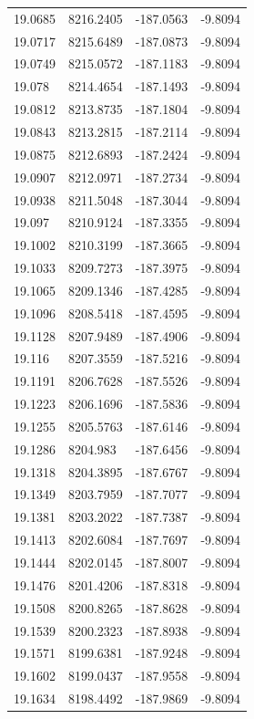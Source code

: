 \begin{table}[H]
\begin{tabular}{llll}
19.0685 & 8216.2405 & -187.0563 & -9.8094 \\
19.0717 & 8215.6489 & -187.0873 & -9.8094 \\
19.0749 & 8215.0572 & -187.1183 & -9.8094 \\
19.078 & 8214.4654 & -187.1493 & -9.8094 \\
19.0812 & 8213.8735 & -187.1804 & -9.8094 \\
19.0843 & 8213.2815 & -187.2114 & -9.8094 \\
19.0875 & 8212.6893 & -187.2424 & -9.8094 \\
19.0907 & 8212.0971 & -187.2734 & -9.8094 \\
19.0938 & 8211.5048 & -187.3044 & -9.8094 \\
19.097 & 8210.9124 & -187.3355 & -9.8094 \\
19.1002 & 8210.3199 & -187.3665 & -9.8094 \\
19.1033 & 8209.7273 & -187.3975 & -9.8094 \\
19.1065 & 8209.1346 & -187.4285 & -9.8094 \\
19.1096 & 8208.5418 & -187.4595 & -9.8094 \\
19.1128 & 8207.9489 & -187.4906 & -9.8094 \\
19.116 & 8207.3559 & -187.5216 & -9.8094 \\
19.1191 & 8206.7628 & -187.5526 & -9.8094 \\
19.1223 & 8206.1696 & -187.5836 & -9.8094 \\
19.1255 & 8205.5763 & -187.6146 & -9.8094 \\
19.1286 & 8204.983 & -187.6456 & -9.8094 \\
19.1318 & 8204.3895 & -187.6767 & -9.8094 \\
19.1349 & 8203.7959 & -187.7077 & -9.8094 \\
19.1381 & 8203.2022 & -187.7387 & -9.8094 \\
19.1413 & 8202.6084 & -187.7697 & -9.8094 \\
19.1444 & 8202.0145 & -187.8007 & -9.8094 \\
19.1476 & 8201.4206 & -187.8318 & -9.8094 \\
19.1508 & 8200.8265 & -187.8628 & -9.8094 \\
19.1539 & 8200.2323 & -187.8938 & -9.8094 \\
19.1571 & 8199.6381 & -187.9248 & -9.8094 \\
19.1602 & 8199.0437 & -187.9558 & -9.8094 \\
19.1634 & 8198.4492 & -187.9869 & -9.8094 \\

\end{tabular}
\end{table}
